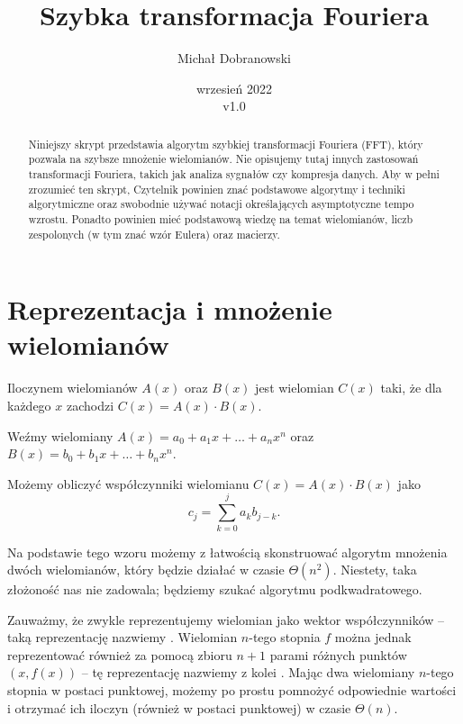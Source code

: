 \documentclass[11pt]{scrartcl}
\title{Szybka transformacja Fouriera}
\author{Michał Dobranowski}
\date{wrzesień 2022 \\ v1.0}
\begin{document}
    \maketitle
    \begin{abstract}
        \noindent Niniejszy skrypt przedstawia algorytm szybkiej transformacji Fouriera (FFT), który pozwala na szybsze mnożenie wielomianów. Nie opisujemy tutaj innych zastosowań transformacji Fouriera, takich jak analiza sygnałów czy kompresja danych.
        Aby w pełni zrozumieć ten skrypt, Czytelnik powinien znać podstawowe algorytmy i techniki algorytmiczne oraz swobodnie używać notacji określających asymptotyczne tempo wzrostu. Ponadto powinien mieć podstawową wiedzę na temat wielomianów, liczb zespolonych (w tym znać wzór Eulera) oraz macierzy.
    \end{abstract}
    \vspace*{\fill}
    {\footnotesize\doclicenseThis}
    \newpage

    \tableofcontents
    \newpage

\section{Reprezentacja i mnożenie wielomianów}
    \begin{definition}
        Iloczynem wielomianów $A(x)$ oraz $B(x)$ jest wielomian $C(x)$ taki, że dla każdego $x$ zachodzi $C(x) = A(x)\cdot B(x)$.
    \end{definition}

    Weźmy wielomiany $A(x) = a_0 + a_1x + \ldots + a_nx^n$ oraz $B(x) = b_0 + b_1x + \ldots + b_nx^n$.
    \begin{fact}
        Możemy obliczyć współczynniki wielomianu $C(x) = A(x) \cdot B(x)$ jako
        $$ c_j = \sum_{k = 0}^j a_kb_{j-k}. $$
    \end{fact}
    Na podstawie tego wzoru możemy z łatwością skonstruować algorytm mnożenia dwóch wielomianów, który będzie działać w czasie $\Theta(n^2)$. Niestety, taka złożoność nas nie zadowala; będziemy szukać algorytmu podkwadratowego.

    Zauważmy, że zwykle reprezentujemy wielomian jako wektor współczynników -- taką reprezentację nazwiemy . Wielomian $n$-tego stopnia $f$ można jednak reprezentować również za pomocą zbioru $n + 1$ parami różnych punktów $(x, f(x))$ -- tę reprezentację nazwiemy z kolei . Mając dwa wielomiany $n$-tego stopnia w postaci punktowej, możemy po prostu pomnożyć odpowiednie wartości i otrzymać ich iloczyn (również w postaci punktowej) w czasie $\Theta(n)$.
\end{document}

